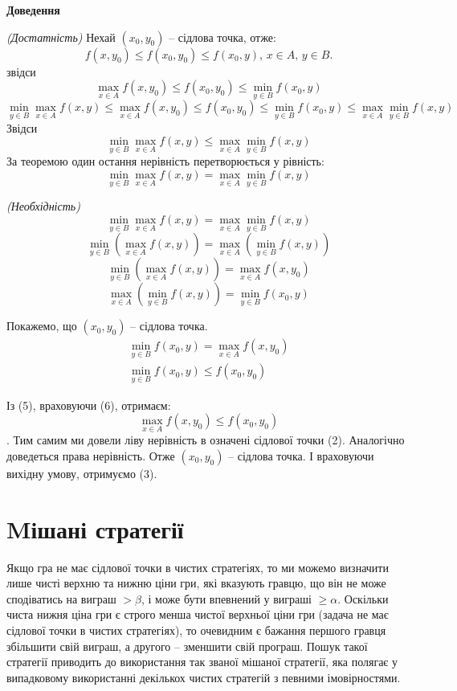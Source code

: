 \documentclass[12pt,a4paper]{book}
\begin{document}
{\bf Доведення}

\emph{(Достатність)} Нехай $(x_0, y_0)$ -- сідлова точка, отже:
\[
f(x, y_0) \le f(x_0, y_0) \le f(x_0, y),\, x \in A,\, y \in B.
\]
звідси
\begin{equation}
\max_{x \in A} f(x, y_0) \le f(x_0, y_0) \le \min_{y \in B} f(x_0, y)
\end{equation}
\[
\min_{y \in B} \max_{x \in A} f(x, y) \le \max_{x \in A} f(x, y_0) \le f(x_0, y_0) \le \min_{y \in B} f(x_0, y) \le \max_{x \in A}  \min_{y \in B} f(x, y)
\]
Звідси
\[
\min_{y \in B} \max_{x \in A} f(x, y)  \le \max_{x \in A}  \min_{y \in B} f(x, y)
\]
За теоремою один остання нерівність перетворюється у рівність:
\[
\min_{y \in B} \max_{x \in A} f(x, y)  = \max_{x \in A}  \min_{y \in B} f(x, y)
\]

\emph{(Необхідність)}
\[\min_{y \in B} \max_{x \in A} f(x, y)  = \max_{x \in A}  \min_{y \in B} f(x, y)\]
\[\min_{y \in B} \left(\max_{x \in A} f(x, y)\right)  = \max_{x \in A}  \left(\min_{y \in B} f(x, y)\right)\]
\[\min_{y \in B} \left(\max_{x \in A} f(x, y)\right)  = \max_{x \in A} f(x, y_0)\]
\[\max_{x \in A} \left(\min_{y \in B} f(x, y)\right)= \min_{y \in B} f(x_0, y)\]

Покажемо, що $(x_0, y_0)$ -- сідлова точка.
\begin{eqnarray}
\min_{y \in B} f(x_0, y)=\max_{x \in A} f(x, y_0)\\
\min_{y \in B} f(x_0, y) \le f(x_0, y_0)
\end{eqnarray}

Із (5), враховуючи (6), отримаєм:
\[\max_{x \in A} f(x, y_0) \le f(x_0, y_0) \]. Тим самим ми довели ліву нерівність в означені сідлової точки (2). Аналогічно доведеться права нерівність. Отже $(x_0, y_0)$ -- сідлова точка. І враховуючи вихідну умову, отримуємо (3).

\section{Mішані стратегії}
Якщо гра не має сідлової точки в чистих стратегіях, то ми можемо визначити лише чисті верхню та нижню ціни гри, які вказують гравцю, що він не може сподіватись на виграш $> \beta$, і може бути впевнений у виграші $\ge \alpha$. Оскільки чиста нижня ціна гри є строго менша чистої верхньої ціни гри (задача не має сідлової точки в чистих стратегіях), то очевидним є бажання першого гравця збільшити свій виграш, а другого -- зменшити свій програш. Пошук такої стратегії приводить до використання так званої мішаної стратегії, яка полягає у випадковому використанні декількох чистих стратегій з певними імовірностями.
\end{document}
